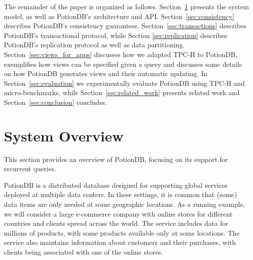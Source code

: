 \documentclass[sigconf, nonacm]{acmart}
\newcommand{\outline}[1]{}
\begin{document}
The remainder of the paper is organized as follows.
Section~\ref{sec:overview} presents the system model, as well as PotionDB's architecture and API.
Section~\ref{sec:consistency} describes PotionDB's consistency guarantees.
Section~\ref{sec:transactions} describes PotionDB's transactional protocol, while Section \ref{sec:replication} describes PotionDB's replication protocol as well as data partitioning.
Section~\ref{sec:views_for_apps} discusses how we adapted TPC-H to PotionDB, exemplifies how views can be specified given a query and discusses some details on how PotionDB generates views and their automatic updating.
In Section~\ref{sec:evaluation} we experimentally evaluate PotionDB using TPC-H and micro-benchmarks, while Section~\ref{sec:related_work} presents related work and Section~\ref{sec:conclusion} concludes.


%


\section{System Overview}
\label{sec:overview}

This section provides an overview of PotionDB, focusing on its support for 
recurrent queries.

PotionDB is a distributed database designed for supporting global services deployed at multiple data centers. 
In these settings,
it is common that (some) data items are only needed at some geographic locations. 
As a running example, we will consider a large e-commerce company with online stores for different countries 
and clients spread across the world. 
The service includes data for millions of products, with some products available 
only at some locations. The service also maintains information about customers and their purchases, 
with clients being associated with one of the online stores.
\end{document}
